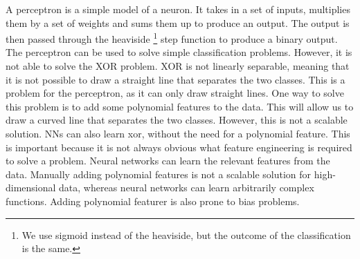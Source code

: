 \documentclass[twoside,11pt]{report}
\begin{document}
    A perceptron is a simple model of a neuron. It takes in a set of inputs, multiplies them by a set of weights 
    and sums them up to produce an output. The output is then passed through the heaviside
    \footnote{We use sigmoid instead of the heaviside, but the outcome of the classification is the same.}
    step function to produce
    a binary output. The perceptron can be used to solve simple classification problems. However, it is not able to
    solve the XOR problem. XOR is not linearly separable, meaning that it is not possible to draw a straight line
    that separates the two classes. This is a problem for the perceptron, as it can only draw straight lines.
    One way to solve this problem is to add some polynomial features to the data. 
    This will allow us to draw a curved line that separates the two classes. However, this is not a scalable solution.
    NNs can also learn xor, without the need for a polynomial feature. This is important because it is not 
    always obvious what feature engineering is required to solve a problem. Neural networks can learn the 
    relevant 
    features from the data. Manually adding polynomial features is not a scalable solution for 
    high-dimensional data,
    whereas neural networks can learn arbitrarily complex functions. Adding polynomial featurer 
    is also prone to 
    bias problems.
\end{document}
